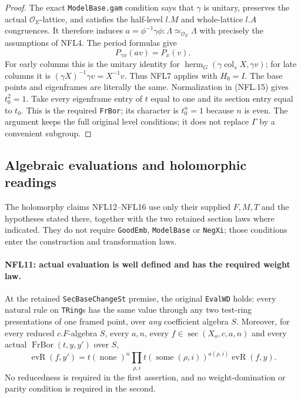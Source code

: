 \documentclass[11pt,a4paper]{article}
\numberwithin{equation}{section}
\theoremstyle{remark}\newtheorem{remark}[theorem]{Remark}
\begin{document}
\begin{proof}
The exact \texttt{Model\allowbreak Base.\allowbreak gam} condition says that $\gamma$
is unitary, preserves the actual $\mathcal O_E$-lattice, and
satisfies the half-level $l.M$ and whole-lattice $l.A$ congruences.
It therefore induces
$a=\phi^{-1}\gamma\phi:\Lambda\simeq_{\mathcal O_E}\Lambda$
with precisely the assumptions of NFL4.  The period formulas
give
\[
 P_{\gamma x}(av)=P_x(v).
 \tag{NFL.21}
\]
For early columns this is the unitary identity for
$\operatorname{herm}_G(\gamma\operatorname{col}_sX,\gamma v)$;
for late columns it is $(\gamma X)^{-1}\gamma v=X^{-1}v$.
Thus NFL7 applies with $H_0=I$.  The base points and eigenframes
are literally the same.  Normalization in (NFL.15) gives
$t_0^2=1$.  Take every eigenframe entry of $t$ equal to one and
its section entry equal to $t_0$.  This is the required
\texttt{Fr\allowbreak Bor}; its character is $t_0^n=1$ because $n$ is even.
The argument keeps the full original level conditions; it does
not replace $\Gamma$ by a convenient subgroup.
\end{proof}

\subsection{Algebraic evaluations and holomorphic readings}

The holomorphy claims NFL12--NFL16 use only their supplied
$F,M,T$ and the hypotheses stated there, together with the two
retained section laws where indicated.  They do not require
\texttt{Good\allowbreak Emb}, \texttt{Model\allowbreak Base} or \texttt{Neg\allowbreak Xi}; those
conditions enter the construction and transformation laws.

\paragraph{NFL11: actual evaluation is well defined and has the required weight law.}
\label{claim:NFL11}
At the retained \texttt{Sec\allowbreak Base\allowbreak Change\allowbreak St} premise, the original
\texttt{Eval\allowbreak WD} holds: every natural rule on \texttt{TRing}s
has the same value through any two test-ring presentations of
one framed point, over \emph{any} coefficient algebra $S$.
Moreover, for every reduced $c.F$-algebra $S$, every $a,n$,
every $f\in\operatorname{sec}(X_o,c,a,n)$ and every actual
$\operatorname{FrBor}(t,y,y')$ over $S$,
\[
 \operatorname{evR}(f,y')
   =t(\operatorname{none})^n
       \prod_{\rho,i}t(\operatorname{some}(\rho,i))^{a(\rho,i)}
          \operatorname{evR}(f,y).
 \tag{NFL.22}
\]
No reducedness is required in the first assertion, and no
weight-domination or parity condition is required in the second.
\end{document}
